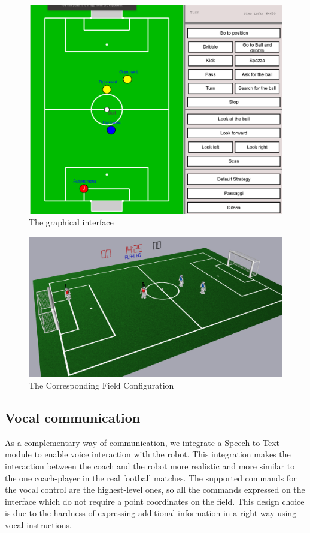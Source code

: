 \documentclass[a4paper, onecolumn, 12pt]{article}
\begin{document}
\begin{figure}[H]
    \centering
    \includegraphics[width=0.9\linewidth]{assets/interface.png}
    \caption{The graphical interface}
    \label{fig:interface}
\end{figure}

\begin{figure}[H]
    \centering
    \includegraphics[width=0.9\linewidth]{assets/simrobot.png}
    \caption{The Corresponding Field Configuration}
    \label{fig:simrobot}
\end{figure}

\subsection{Vocal communication}
As a complementary way of communication, we integrate a Speech-to-Text module to enable voice 
interaction with the robot. This integration makes the interaction between the coach and the robot
more realistic and more similar to the one coach-player in the real football matches. 
The supported commands for the vocal control are the highest-level ones, so all the commands
expressed on the interface which do not require a point coordinates on the field.
This design choice is due to the hardness of expressing additional information in a right way
using vocal instructions.
\end{document}
